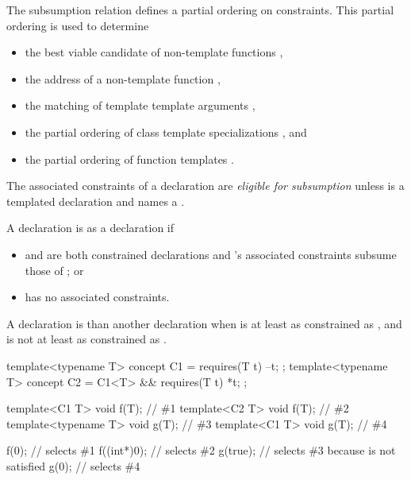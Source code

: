 \documentclass{wg21}
\begin{document}
\pnum
\begin{note}
The subsumption relation defines a partial ordering on constraints.
This partial ordering is used to determine
\begin{itemize}
    \item the best viable candidate of non-template functions ,
    \item the address of a non-template function ,
    \item the matching of template template arguments ,
    \item the partial ordering of class template specializations , and
    \item the partial ordering of function templates .
\end{itemize}
\end{note}

\begin{addedblock}

The associated constraints  of a declaration  are \emph{eligible for subsumption}
unless  is a templated declaration and  names a .


\end{addedblock}


\pnum
A declaration  is
 as
a declaration  if
\begin{itemize}
    \item {} and  are both constrained declarations and
    's associated constraints
     subsume those of ; or

    \item {} has no associated constraints.
\end{itemize}

\pnum
A declaration  is 
than another declaration  when  is at least as
constrained as , and  is not at least as
constrained as .
\begin{example}
\begin{codeblock}
    template<typename T> concept C1 = requires(T t) { --t; };
    template<typename T> concept C2 = C1<T> && requires(T t) { *t; };

    template<C1 T> void f(T);       // \#1
    template<C2 T> void f(T);       // \#2
    template<typename T> void g(T); // \#3
    template<C1 T> void g(T);       // \#4

    f(0);                           // selects \#1
    f((int*)0);                     // selects \#2
    g(true);                        // selects \#3 because  is not satisfied
    g(0);                           // selects \#4
\end{codeblock}
\end{example}
\end{document}
